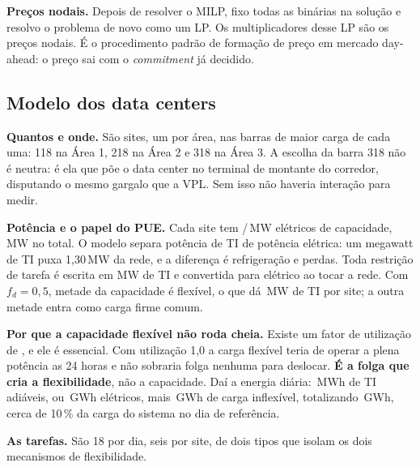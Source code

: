 \documentclass[11pt,a4paper]{article}
\begin{document}
\textbf{Preços nodais.} Depois de resolver o MILP, fixo todas as binárias na solução e resolvo o problema
de novo como um LP. Os multiplicadores desse LP são os preços nodais. É o procedimento padrão de formação
de preço em mercado day-ahead: o preço sai com o \emph{commitment} já decidido.

\subsection{Modelo dos data centers}

\textbf{Quantos e onde.} São \numdcnsites{} sites, um por área, nas barras de maior carga de cada uma:
118 na Área 1, 218 na Área 2 e 318 na Área 3. A escolha da barra 318 não é neutra: é ela que põe o data
center no terminal de montante do corredor, disputando o mesmo gargalo que a VPL. Sem isso não haveria
interação para medir.

\begin{table}[htbp]
\centering\small
\caption{Composição dos três sites. A potência de TI é a elétrica dividida pelo PUE.}
\tabdcsites
\end{table}

\textbf{Potência e o papel do PUE.} Cada site tem \numdccap{}/\numdcnsites{}\,MW elétricos de capacidade,
\numdccap{}\,MW no total. O modelo separa potência de TI de potência elétrica: um megawatt de TI puxa
1{,}30\,MW da rede, e a diferença é refrigeração e perdas. Toda restrição de tarefa é escrita em MW de TI
e convertida para elétrico ao tocar a rede. Com $f_d = 0{,}5$, metade da capacidade é flexível, o que dá
\numdcflexit{}\,MW de TI por site; a outra metade entra como carga firme comum.

\textbf{Por que a capacidade flexível não roda cheia.} Existe um fator de utilização de \numdcutil{}, e
ele é essencial. Com utilização 1{,}0 a carga flexível teria de operar a plena potência as 24 horas e não
sobraria folga nenhuma para deslocar. \textbf{É a folga que cria a flexibilidade}, não a capacidade. Daí
a energia diária: \numvdcit{}\,MWh de TI adiáveis, ou \numdcelet{}\,GWh elétricos, mais
\numdcinflexdia{}\,GWh de carga inflexível, totalizando \numdctotaldia{}\,GWh, cerca de 10\,\% da carga do
sistema no dia de referência.

\textbf{As tarefas.} São 18 por dia, seis por site, de dois tipos que isolam os dois mecanismos de
flexibilidade.

\begin{table}[htbp]
\centering\small
\caption{As 18 tarefas por tipo. As \emph{batch} só rodam no site nativo e dão flexibilidade no tempo;
as migráveis rodam nos três sites e, com janela curta, dão flexibilidade no espaço.}
\tabdctarefas
\end{table}
\end{document}
